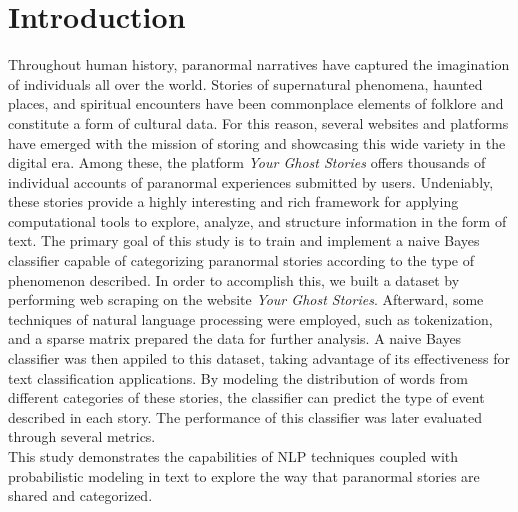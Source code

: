 \documentclass[twocolumn]{article}
\begin{document}
\section{Introduction}
Throughout human history, paranormal narratives have captured the imagination of individuals all over the world. Stories of supernatural phenomena, haunted places, and spiritual encounters have been commonplace elements of folklore and constitute a form of cultural data. For this reason, several websites and platforms have emerged with the mission of storing and showcasing this wide variety in the digital era. Among these, the platform \textit{Your Ghost Stories} offers thousands of individual accounts of paranormal experiences submitted by users. Undeniably, these stories provide a highly interesting and rich framework for applying computational tools to explore, analyze, and structure information in the form of text.
The primary goal of this study is to train and implement a naive Bayes classifier capable of categorizing paranormal stories according to the type of phenomenon described. In order to accomplish this, we built a dataset by performing web scraping on the website \textit{Your Ghost Stories}. Afterward, some techniques of natural language processing were employed, such as tokenization, and a sparse matrix prepared the data for further analysis. 
A naive Bayes classifier was then appiled to this dataset, taking advantage of its effectiveness for text classification applications. By modeling the distribution of words from different categories of these stories, the classifier can predict the type of event described in each story. The performance of this classifier was later evaluated through several metrics. \\
This study demonstrates the capabilities of NLP techniques coupled with probabilistic modeling in text to explore the way that paranormal stories are shared and categorized.
\end{document}

